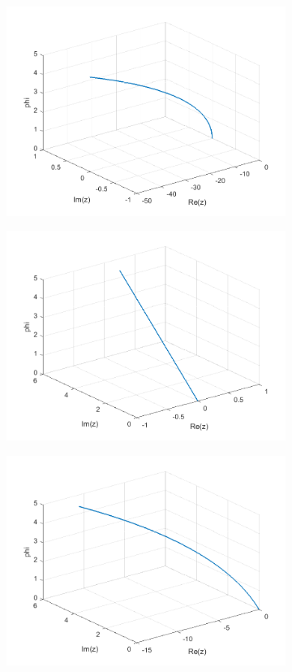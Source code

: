 \documentclass[a4paper,11pt]{article}
\begin{document}
\begin{figure}[!h]
\begin{subfigure}[c]{0.3\textwidth}
\includegraphics[width=\linewidth]{plot6_musg12.png}
\end{subfigure}
\begin{subfigure}[c]{0.3\textwidth}
\includegraphics[width=\linewidth]{plot6_musg20.png}
\end{subfigure}
\begin{subfigure}[c]{0.3\textwidth}
\includegraphics[width=\linewidth]{plot6_musg21.png}

\end{subfigure}
\end{figure}
\end{document}

